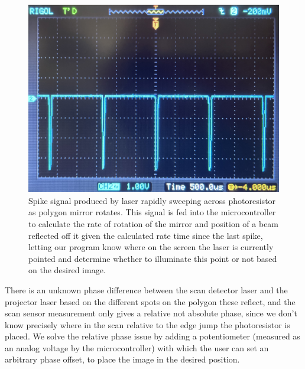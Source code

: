\documentclass[twocolumn]{revtex4-2}
\begin{document}
\begin{figure}
    \centering
    \includegraphics[width=0.95\linewidth]{spike-signal.jpeg}
    \caption[Scan Timing (Spike) Signal]{Spike signal produced by laser rapidly sweeping across photoresistor as polygon mirror rotates. This signal is fed into the microcontroller to calculate the rate of rotation of the mirror and position of a beam reflected off it given the calculated rate time since the last spike, letting our program know where on the screen the laser is currently pointed and determine whether to illuminate this point or not based on the desired image.}
    \label{fig:spike-signal}
\end{figure}

There is an unknown phase difference between the scan detector laser and the projector laser based on  the different spots on the polygon these reflect, and the scan sensor measurement only gives a relative not absolute phase, since we don't know precisely where in the scan relative to the edge jump the photoresistor is placed. We solve the relative phase issue by adding a potentiometer (measured as an analog voltage by the microcontroller) with which the user can set an arbitrary phase offset, to place the image in the desired position. 
\end{document}
